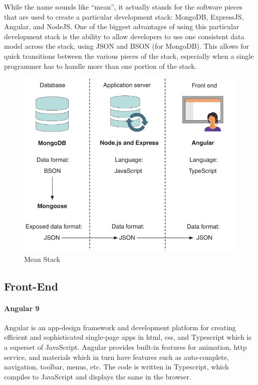 While the name sounds like “mean”, it actually stands for the software pieces that are used to create a particular development stack: MongoDB, ExpressJS, Angular, and NodeJS. One of the biggest advantages of using this particular development stack is the ability to allow developers to use one consistent data model across the stack, using JSON and BSON (for MongoDB). This allows for quick transitions between the various pieces of the stack, especially when a single programmer has to handle more than one portion of the stack.

\begin{figure}[!ht]
      \center
      \includegraphics[scale=0.60]{assets/mean.png}
      \caption{Mean Stack}
      \label{fig:mean}
\end{figure}
\subsection{Front-End}
\paragraph{Angular 9}
Angular is an app-design framework and development platform for creating efficient and sophisticated single-page apps in html, css, and Typescript which is a superset of JavaScript. Angular provides built-in features for animation, http service, and materials which in turn have features such as auto-complete, navigation, toolbar, menus, etc. The code is written in Typescript, which compiles to JavaScript and displays the same in the browser.

